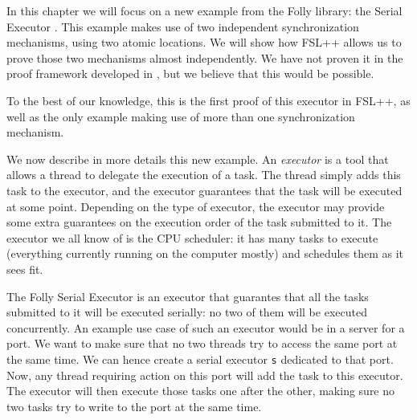 \label{ch:serialExec}
In this chapter we will focus on a new example from the Folly library: the Serial Executor \cite{serialExec}. This example makes use of two independent synchronization mechanisms, using two atomic locations. We will show how FSL++ allows us to prove those two mechanisms almost independently.%
We have not proven it in the proof framework developed in \cite{pascal}, but we believe that this would be possible.

To the best of our knowledge, this is the first proof of this executor in FSL++,  as well as the only example making use of more than one synchronization mechanism.

We now describe in more details this new example. An \emph{executor} is a tool that allows a thread to delegate the execution of a task. The thread simply adds this task to the executor, and the executor guarantees that the task will be executed at some point. Depending on the type of executor, the executor may provide some extra guarantees on the execution order of the task submitted to it. The executor we all know of is the CPU scheduler: it has many tasks to execute (everything currently running on the computer mostly) and schedules them as it sees fit.

The Folly Serial Executor is an executor that guarantes that all the tasks submitted to it will be executed serially: no two of them will be executed concurrently. %
An example use case of such an executor would be in a server for a port. We want to make sure that no two threads try to access the same port at the same time. We can hence create a serial executor \texttt{s} dedicated to that port. Now, any thread requiring action on this port will add the task to this executor. The executor will then execute those tasks one after the other, making sure no two tasks try to write to the port at the same time.


